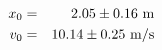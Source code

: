 \begin{eqnarray*}
x_0 & = & 2.05 \pm 0.16 ~{\rm m}\\
v_0 & = & 10.14 \pm 0.25 ~{\rm m}/{\rm s}\\
\end{eqnarray*}
